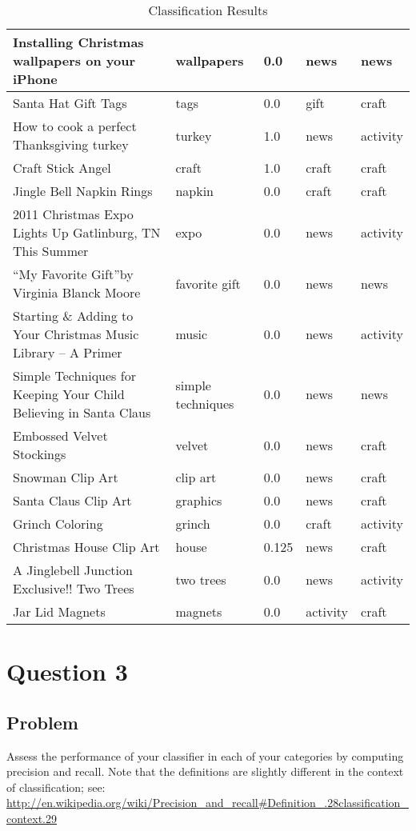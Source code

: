 \documentclass[letterpaper,11pt]{report}
\begin{document}
\begin{savenotes}
\begin{table}[htbp]
\begin{tabular}{|p{8cm}|l|l|l|l|}
Installing Christmas wallpapers on your iPhone&wallpapers&0.0&news&news\\ \hline
Santa Hat Gift Tags&tags&0.0&gift&craft\\ \hline
How to cook a perfect Thanksgiving turkey&turkey&1.0&news&activity\\ \hline
Craft Stick Angel&craft&1.0&craft&craft\\ \hline
Jingle Bell Napkin Rings&napkin&0.0&craft&craft\\ \hline
2011 Christmas Expo Lights Up Gatlinburg, TN This Summer&expo&0.0&news&activity\\ \hline
``My Favorite Gift''by Virginia Blanck Moore&favorite gift&0.0&news&news\\ \hline
Starting \& Adding to Your Christmas Music Library – A Primer&music&0.0&news&activity\\ \hline
Simple Techniques for Keeping Your Child Believing in Santa Claus&simple techniques&0.0&news&news\\ \hline
Embossed Velvet Stockings&velvet&0.0&news&craft\\ \hline
Snowman Clip Art&clip art&0.0&news&craft\\ \hline
Santa Claus Clip Art&graphics&0.0&news&craft\\ \hline
Grinch Coloring&grinch&0.0&craft&activity\\ \hline
Christmas House Clip Art&house&0.125&news&craft\\ \hline
A Jinglebell Junction Exclusive!! Two Trees&two trees&0.0&news&activity\\ \hline
Jar Lid Magnets&magnets&0.0&activity&craft\\ \hline
		\end{tabular}
	\caption{Classification Results}
	\label{tab:results}
\end{table}


\section{Question 3}
\subsection{Problem}Assess the performance of your classifier in each of your categories by computing precision and recall.  Note that the definitions are slightly different in the context of classification; see: \small\url{http://en.wikipedia.org/wiki/Precision_and_recall#Definition_.28classification_context.29}\par

\end{savenotes}
\end{document}
